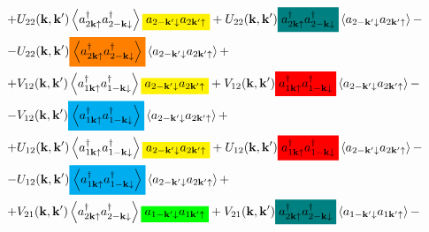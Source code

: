 \documentclass[class=article, crop=false]{standalone}
\newcommand{\mathcolorbox}[2]{\colorbox{#1}{$\displaystyle #2$}}
\begin{document}
\begin{equation}
\begin{split}
		+ & U_{ 2 2} ( \mathbf{k}, \mathbf{k}') \left\langle a^{ \dagger}_{ 2 \mathbf{k} \uparrow} a^{ \dagger}_{ 2 -\mathbf{k} \downarrow} \right\rangle \mathcolorbox{yellow}{a_{ 2 -\mathbf{k}' \downarrow} a_{ 2 \mathbf{k}' \uparrow}} + U_{ 2 2} ( \mathbf{k}, \mathbf{k}') \mathcolorbox{teal}{a^{ \dagger}_{ 2 \mathbf{k} \uparrow} a^{ \dagger}_{ 2 -\mathbf{k} \downarrow}} \left\langle a_{ 2 -\mathbf{k}' \downarrow} a_{ 2 \mathbf{k}' \uparrow} \right\rangle - \\
		- & U_{ 2 2} ( \mathbf{k}, \mathbf{k}') \mathcolorbox{orange}{\left\langle a^{ \dagger}_{ 2 \mathbf{k} \uparrow} a^{ \dagger}_{ 2 -\mathbf{k} \downarrow} \right\rangle} \left\langle a_{ 2 -\mathbf{k}' \downarrow} a_{ 2 \mathbf{k}' \uparrow} \right\rangle + \\
		+ & V_{ 1 2} ( \mathbf{k}, \mathbf{k}') \left\langle a^{ \dagger}_{ 1 \mathbf{k} \uparrow} a^{ \dagger}_{ 1 -\mathbf{k} \downarrow} \right\rangle \mathcolorbox{yellow}{a_{ 2 -\mathbf{k}' \downarrow} a_{ 2 \mathbf{k}' \uparrow}} + V_{ 1 2} ( \mathbf{k}, \mathbf{k}') \mathcolorbox{red}{a^{ \dagger}_{ 1 \mathbf{k} \uparrow} a^{ \dagger}_{ 1 -\mathbf{k} \downarrow}} \left\langle a_{ 2 -\mathbf{k}' \downarrow} a_{ 2 \mathbf{k}' \uparrow} \right\rangle - \\
		- & V_{ 1 2} ( \mathbf{k}, \mathbf{k}') \mathcolorbox{cyan}{\left\langle a^{ \dagger}_{ 1 \mathbf{k} \uparrow} a^{ \dagger}_{ 1 -\mathbf{k} \downarrow} \right\rangle} \left\langle a_{ 2 -\mathbf{k}' \downarrow} a_{ 2 \mathbf{k}' \uparrow} \right\rangle + \\
		+ & U_{ 1 2} ( \mathbf{k}, \mathbf{k}') \left\langle a^{ \dagger}_{ 1 \mathbf{k} \uparrow} a^{ \dagger}_{ 1 -\mathbf{k} \downarrow} \right\rangle \mathcolorbox{yellow}{a_{ 2 -\mathbf{k}' \downarrow} a_{ 2 \mathbf{k}' \uparrow}} + U_{ 1 2} ( \mathbf{k}, \mathbf{k}') \mathcolorbox{red}{a^{ \dagger}_{ 1 \mathbf{k} \uparrow} a^{ \dagger}_{ 1 -\mathbf{k} \downarrow}} \left\langle a_{ 2 -\mathbf{k}' \downarrow} a_{ 2 \mathbf{k}' \uparrow} \right\rangle - \\
		- & U_{ 1 2} ( \mathbf{k}, \mathbf{k}') \mathcolorbox{cyan}{\left\langle a^{ \dagger}_{ 1 \mathbf{k} \uparrow} a^{ \dagger}_{ 1 -\mathbf{k} \downarrow} \right\rangle} \left\langle a_{ 2 -\mathbf{k}' \downarrow} a_{ 2 \mathbf{k}' \uparrow} \right\rangle + \\
		+ & V_{ 2 1} ( \mathbf{k}, \mathbf{k}') \left\langle a^{ \dagger}_{ 2 \mathbf{k} \uparrow} a^{ \dagger}_{ 2 -\mathbf{k} \downarrow} \right\rangle \mathcolorbox{green}{a_{ 1 -\mathbf{k}' \downarrow} a_{ 1 \mathbf{k}' \uparrow}} + V_{ 2 1} ( \mathbf{k}, \mathbf{k}') \mathcolorbox{teal}{a^{ \dagger}_{ 2 \mathbf{k} \uparrow} a^{ \dagger}_{ 2 -\mathbf{k} \downarrow}} \left\langle a_{ 1 -\mathbf{k}' \downarrow} a_{ 1 \mathbf{k}' \uparrow} \right\rangle - \\

\end{split}
\end{equation}
\end{document}
